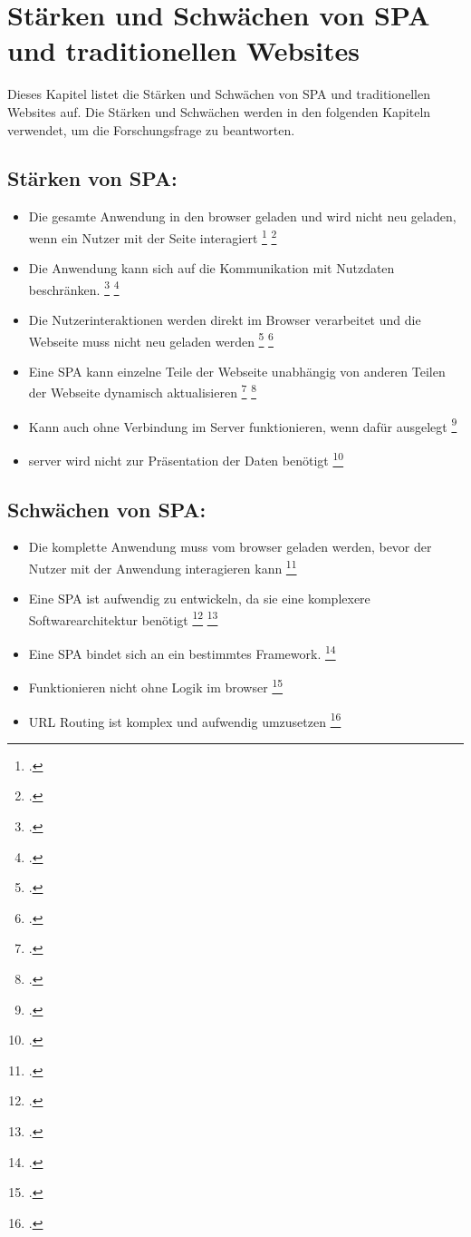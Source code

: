 \section{Stärken und Schwächen von \ac{SPA} und traditionellen Websites}
Dieses Kapitel listet die Stärken und Schwächen von \ac{SPA} und traditionellen Websites auf.
Die Stärken und Schwächen werden in den folgenden Kapiteln verwendet, um die Forschungsfrage zu beantworten.

\subsection{Stärken von \ac{SPA}:}
\begin{itemize}
    \item Die gesamte Anwendung in den \gls{browser} geladen und wird nicht neu geladen, wenn ein Nutzer mit der Seite interagiert \footcite[Vgl. ][Seite 3]{Smith2022} \footcite[Vgl.][Seite 7]{Flanagan2011}
    \item Die Anwendung kann sich auf die Kommunikation mit Nutzdaten beschränken. \footcite[Vgl. ][Seite 3]{Smith2022} \footcite[Vgl.][Seite 13]{Flanagan2011}
    \item Die Nutzerinteraktionen werden direkt im Browser verarbeitet und die Webseite muss nicht neu geladen werden \footcite[Vgl. ][Seite 3]{Smith2022} \footcite[Vgl.][Seite 12]{Flanagan2011}
    \item Eine \ac{SPA} kann einzelne Teile der Webseite unabhängig von anderen Teilen der Webseite dynamisch aktualisieren \footcite[Vgl. ][Seite 7]{Smith2022} \footcite[Vgl.][Seite 9]{Flanagan2011}
    \item Kann auch ohne Verbindung im Server funktionieren, wenn dafür ausgelegt \footcite[Vgl. ][Seite 7]{Smith2022}
    \item \gls{server} wird nicht zur Präsentation der Daten benötigt \footcite[Vgl. ][Seite 7]{Flanagan2011}
\end{itemize}


\subsection{Schwächen von \ac{SPA}:}

\begin{itemize}
    \item Die komplette Anwendung muss vom \gls{browser} geladen werden, bevor der Nutzer mit der Anwendung interagieren kann \footcite[Vgl. ][Seite 3]{Smith2022}
    \item Eine \ac{SPA} ist aufwendig zu entwickeln, da sie eine komplexere Softwarearchitektur benötigt \footcite[Vgl. ][Seite 4]{Smith2022} \footcite[Vgl.][Seite 15]{Flanagan2011}
    \item Eine \ac{SPA} bindet sich an ein bestimmtes Framework. \footcite[Vgl. ][Seite 4]{Smith2022}
    \item Funktionieren nicht ohne Logik im \gls{browser} \footcite[Vgl. ][Seite 7]{Smith2022}
    \item \ac{URL} Routing ist komplex und aufwendig umzusetzen \footcite[Vgl. ][Seite 7]{Smith2022}
\end{itemize}

